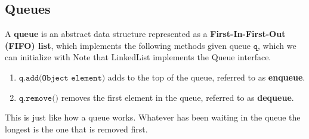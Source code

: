 \subsection{Queues}

  \begin{definition}[Queue]
    A \textbf{queue} is an abstract data structure represented as a \textbf{First-In-First-Out (FIFO) list}, which implements the following methods given queue $\texttt{q}$, which we can initialize with Note that LinkedList implements the Queue interface. 
    \begin{enumerate}
        \item $\texttt{q.add(Object element)}$ adds to the top of the queue, referred to as \textbf{enqueue}. 
        \item $\texttt{q.remove()}$ removes the first element in the queue, referred to as \textbf{dequeue}. 
    \end{enumerate}
    This is just like how a queue works. Whatever has been waiting in the queue the longest is the one that is removed first. 
  \end{definition}

